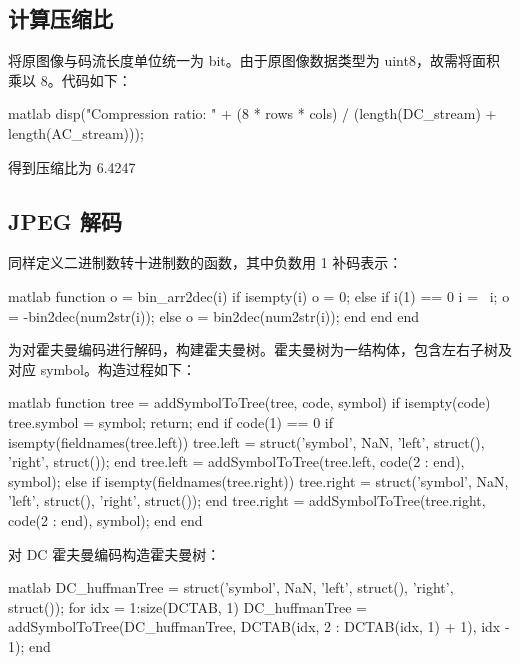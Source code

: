 \documentclass[a4paper]{article}  %
\begin{document}
\subsection{计算压缩比}

将原图像与码流长度单位统一为 bit。由于原图像数据类型为 uint8，故需将面积乘以 8。代码如下：

\begin{codeblock}{matlab}
disp("Compression ratio: " + (8 * rows * cols) / (length(DC_stream) + length(AC_stream)));
\end{codeblock}

得到压缩比为 6.4247

\subsection{JPEG 解码}

同样定义二进制数转十进制数的函数，其中负数用 1 补码表示：

\begin{codeblock}{matlab}
function o = bin_arr2dec(i)
    if isempty(i)
        o = 0;
    else
        if i(1) == 0
            i = ~i;
            o = -bin2dec(num2str(i));
        else
            o = bin2dec(num2str(i));
        end
    end
end
\end{codeblock}

为对霍夫曼编码进行解码，构建霍夫曼树。霍夫曼树为一结构体，包含左右子树及对应 symbol。构造过程如下：

\begin{codeblock}{matlab}
function tree = addSymbolToTree(tree, code, symbol)
    if isempty(code)
        tree.symbol = symbol;
        return;
    end
    if code(1) == 0
        if isempty(fieldnames(tree.left))
            tree.left = struct('symbol', NaN, 'left', struct(), 'right', struct());
        end
        tree.left = addSymbolToTree(tree.left, code(2 : end), symbol);
    else
        if isempty(fieldnames(tree.right))
            tree.right = struct('symbol', NaN, 'left', struct(), 'right', struct());
        end
        tree.right = addSymbolToTree(tree.right, code(2 : end), symbol);
    end
end
\end{codeblock}

对 DC 霍夫曼编码构造霍夫曼树：

\begin{codeblock}{matlab}
DC_huffmanTree = struct('symbol', NaN, 'left', struct(), 'right', struct());
for idx = 1:size(DCTAB, 1)
    DC_huffmanTree = addSymbolToTree(DC_huffmanTree, DCTAB(idx, 2 : DCTAB(idx, 1) + 1), idx - 1);
end
\end{codeblock}
\end{document}
